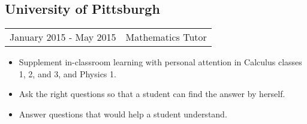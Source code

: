 \documentclass{article}
\begin{document}
    \subsection*{University of Pittsburgh}
      \begin{tabular}{l | r}
        January 2015 - May 2015 &
        Mathematics Tutor
      \end{tabular}
      \begin{itemize}
        \item Supplement in-classroom learning with personal attention in Calculus classes 1, 2, and 3, and Physics 1.
        \item Ask the right questions so that a student can find the answer by herself.
        \item Answer questions that would help a student understand.
      \end{itemize}
\end{document}
